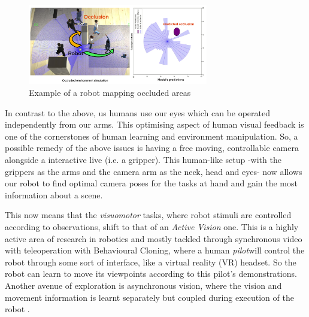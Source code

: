   \begin{figure}[h]
    \centering
    \includegraphics[width=0.7\textwidth]{assets/intro/intro-occlusion.png}
    \caption{Example of a robot mapping occluded areas \cite{ranaraja2024occlusionawareobstacleprediction}}\label{fig:ex-occlusion}
  \end{figure}
    
  In contrast to the above, us humans use our eyes which can be operated independently from our arms. This optimising aspect of human visual feedback \cite{findlay2003active,maiello2021humans,goodman2018using} is one of the cornerstones of human learning and environment manipulation. So, a possible remedy of the above issues is having a free moving, controllable camera alongside a interactive live (i.e. a gripper). This human-like setup -with the grippers as the arms and the camera arm as the neck, head and eyes- now allows our robot to find optimal camera poses for the tasks at hand and gain the most information about a scene.
  
  This now means that the \emph{visuomotor} tasks, where robot stimuli are controlled according to observations, shift to that of an \emph{Active Vision} one. This is a highly active area of research in robotics and mostly tackled through synchronous video with teleoperation \cite{exploringActiveVision2024chuang} with Behavioural Cloning, where a human \emph{pilot}will control the robot through some sort of interface, like a virtual reality (VR) headset. So the robot can learn to move its viewpoints according to this pilot's demonstrations. Another avenue of exploration is asynchronous vision, where the vision and movement information is learnt separately but coupled during execution of the robot \cite{natarajan2021graspsynthesisnovelobjects,wang2024observeactasynchronousactive}.


